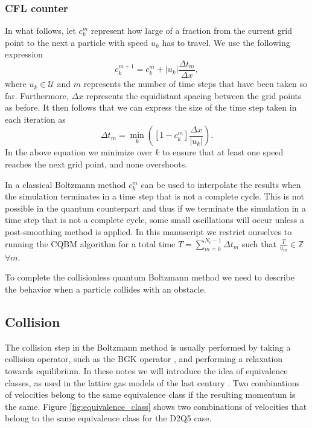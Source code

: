 \subsubsection{CFL counter}\label{ssec:cfl_counter}
In what follows, let $c^m_k$ represent how large of a fraction from the current grid point to the next a particle with speed $u_k$ has to travel.
We use the following expression
\begin{equation}
    c^{m+1}_{k} = c^m_{k} + |u_k| \frac{\Delta t_m}{\Delta x},
\end{equation}
where $u_k \in \mathcal{U}$ and $m$ represents the number of time steps that have been taken so far. Furthermore, $\Delta x$ represents the equidistant spacing between the grid points as before.  
It then follows that we can express the size of the time step taken in each iteration as
\begin{equation}\label{eq:delta_t}
    \Delta t_m = \min_{k} \left ( \left [1-c^m_{k} \right ] \frac{\Delta x}{|u_k|}  \right ).
\end{equation}
In the above equation we minimize over $k$ to ensure that at least one speed reaches the next grid point, and none overshoots. 

In a classical Boltzmann method $c_k^{m}$ can be used to interpolate the results when the simulation terminates in a time step that is not a complete cycle. This is not possible in the quantum counterpart and thus if we terminate the simulation in a time step that is not a complete cycle, some small oscillations will occur unless a post-smoothing method is applied. In this manuscript we restrict ourselves to running the CQBM algorithm for a total time $T = \sum_{m=0}^{N_t -1} \Delta t_m$ such that $\frac{T}{u_m} \in \mathbb{Z}$ $\forall m$. 

To complete the collisionless quantum Boltzmann method we need to describe the behavior when a particle collides with an obstacle. 

\subsection{Collision}
The collision step in the Boltzmann method is usually performed by taking a collision operator, such as the BGK operator \cite{Bhatnagar1954}, and performing a relaxation towards equilibrium. In these notes we will introduce the idea of equivalence classes, as used in the lattice gas models of the last century \cite{Yepez1998}. Two combinations of velocities belong to the same equivalence class if the resulting momentum is the same. Figure \ref{fig:equivalence_class} shows two combinations of velocities that belong to the same equivalence class for the D2Q5 case.

